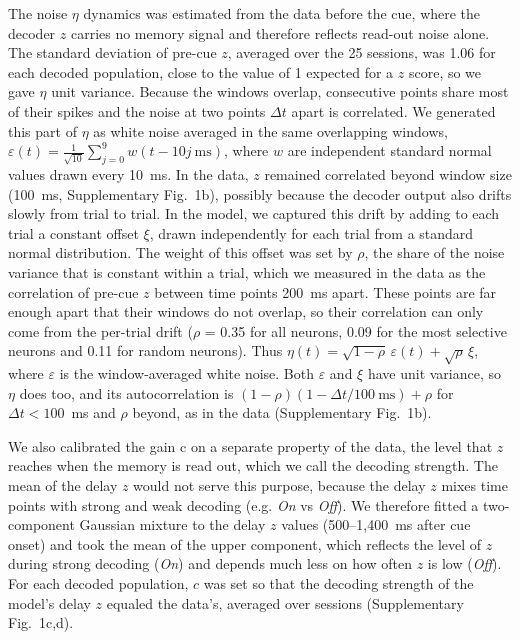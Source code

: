 \documentclass[11pt]{article}
\begin{document}
The noise $\eta$ dynamics was estimated from the data before the cue, where the decoder $z$ carries no memory signal and therefore reflects read-out noise alone. The standard deviation of pre-cue $z$, averaged over the 25 sessions, was 1.06 for each decoded population, close to the value of 1 expected for a $z$ score, so we gave $\eta$ unit variance. Because the windows overlap, consecutive points share most of their spikes and the noise at two points $\Delta t$ apart is correlated. We generated this part of $\eta$ as white noise averaged in the same overlapping windows, $\varepsilon(t) = \frac{1}{\sqrt{10}}\sum_{j=0}^{9} w(t - 10j~\mathrm{ms})$, where $w$ are independent standard normal values drawn every 10~ms. In the data, $z$ remained correlated beyond window size (100~ms, Supplementary Fig.~1b), possibly because the decoder output also drifts slowly from trial to trial. In the model, we captured this drift by adding to each trial a constant offset $\xi$, drawn independently for each trial from a standard normal distribution. The weight of this offset was set by $\rho$, the share of the noise variance that is constant within a trial, which we measured in the data as the correlation of pre-cue $z$ between time points 200~ms apart. These points are far enough apart that their windows do not overlap, so their correlation can only come from the per-trial drift ($\rho$ = 0.35 for all neurons, 0.09 for the most selective neurons and 0.11 for random neurons). Thus $\eta(t) = \sqrt{1-\rho}\,\varepsilon(t) + \sqrt{\rho}\,\xi$, where $\varepsilon$ is the window-averaged white noise. Both $\varepsilon$ and $\xi$ have unit variance, so $\eta$ does too, and its autocorrelation is $(1-\rho)(1-\Delta t/100~\mathrm{ms}) + \rho$ for $\Delta t < 100$~ms and $\rho$ beyond, as in the data (Supplementary Fig.~1b).

We also calibrated the gain c on a separate property of the data, the level that $z$ reaches when the memory is read out, which we call the decoding strength. The mean of the delay $z$ would not serve this purpose, because the delay $z$ mixes time points with strong and weak decoding (e.g. \emph{On} vs \emph{Off}). We therefore fitted a two-component Gaussian mixture to the delay $z$ values (500--1,400~ms after cue onset) and took the mean of the upper component, which reflects the level of $z$ during strong decoding (\emph{On}) and depends much less on how often $z$ is low (\emph{Off}). For each decoded population, $c$ was set so that the decoding strength of the model's delay $z$ equaled the data's, averaged over sessions (Supplementary Fig.~1c,d).
\end{document}

